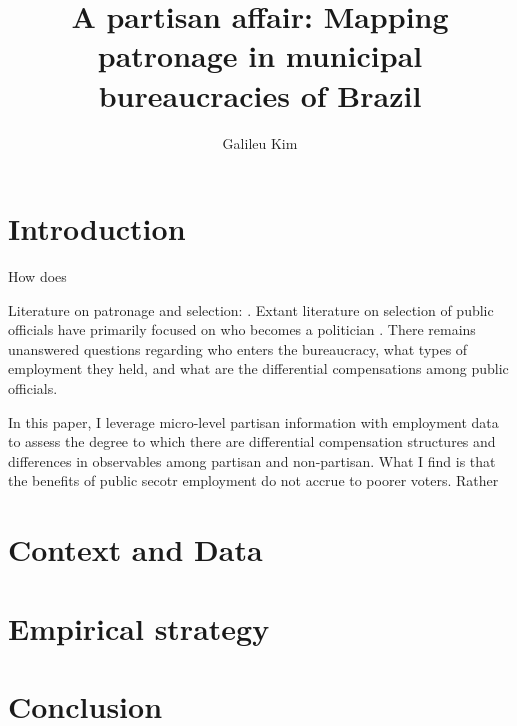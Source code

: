 \documentclass[12pt,a4paper]{article}
\title{A partisan affair: Mapping patronage in municipal bureaucracies of Brazil}
\author{Galileu Kim}
\affil{Princeton University}
\begin{document}
\maketitle


\newpage

\section{Introduction}
\label{sec:intro}

How does 

Literature on patronage and selection: \citet{robinson2013political}. Extant literature on selection of public officials have primarily focused on who becomes a politician \citet{dal2017becomes}. There remains unanswered questions regarding who enters the bureaucracy, what types of employment they held, and what are the differential compensations among public officials.

In this paper, I leverage micro-level partisan information with employment data to assess the degree to which there are differential compensation structures and differences in observables among partisan and non-partisan. What I find is that the benefits of public secotr employment do not accrue to poorer voters. Rather 

\section{Context and Data}
\label{sec:context}

\section{Empirical strategy}
\label{sec:empirical}

\section{Conclusion}
\label{sec:conclusion}

\newpage


\end{document}
